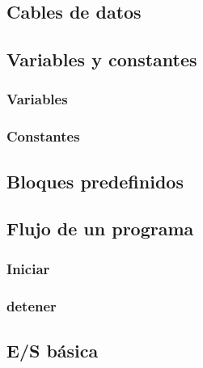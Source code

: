 \documentclass[12pt,a4paper]{article}
\begin{document}
\subsection{Cables de datos}
\subsection{Variables y constantes}
\subsubsection{Variables}
\subsubsection{Constantes}
\subsection{Bloques predefinidos}
\subsection{Flujo de un programa}
\subsubsection{Iniciar}
\subsubsection{detener}
\subsection{E/S básica}
\end{document}
